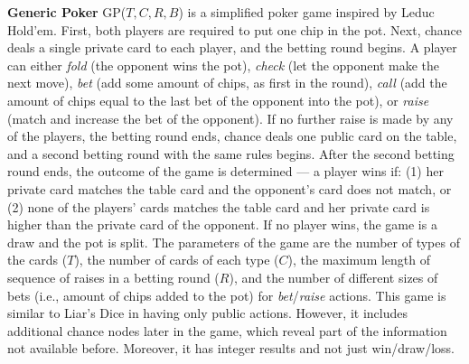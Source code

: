 \documentclass{aamas2015}
\begin{document}
\textbf{Generic Poker} GP($T,C,R,B$) is a simplified poker game inspired by Leduc Hold'em. First, both players are required to put one chip in the pot.
Next, chance deals a single private card to each player, and the betting round begins.
A player can either \emph{fold} (the opponent wins the pot), \emph{check} (let the opponent make the next move), \emph{bet} (add some amount of chips, as first in the round), \emph{call} (add the amount of chips equal to the last bet of the opponent into the pot), or \emph{raise} (match and increase the bet of the opponent).
If no further raise is made by any of the players, the betting round ends, chance deals one public card on the table, and a second betting round with the same rules begins.
After the second betting round ends, the outcome of the game is determined --- a player wins if: (1) her private card matches the table card and the opponent's card does not match, or (2) none of the players' cards matches the table card and her private card is higher than the private card of the opponent. If no player wins, the game is a draw and the pot is split.
The parameters of the game are the number of types of the cards ($T$), the number of cards of each type ($C$), the maximum length of sequence of raises in a betting round ($R$), and the number of different sizes of bets (i.e., amount of chips added to the pot) for \emph{bet}/\emph{raise} actions.
This game is similar to Liar's Dice in having only public actions. However, it includes additional chance nodes later in the game, which reveal part of the information not available before. Moreover, it has integer results and not just win/draw/loss.
\end{document}
